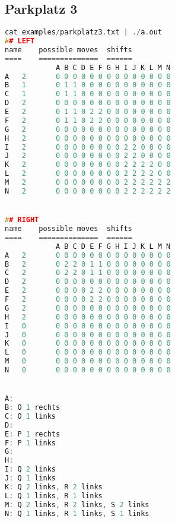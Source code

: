 \documentclass[a4paper,10pt,ngerman]{scrartcl}
\begin{document}
\subsection*{Parkplatz 3}
\begin{lstlisting}[language=C++]
cat examples/parkplatz3.txt | ./a.out
## LEFT
name	possible moves	shifts
====	==============	======
			A B C D E F G H I J K L M N
A	2		0 0 0 0 0 0 0 0 0 0 0 0 0 0
B	1		0 1 1 0 0 0 0 0 0 0 0 0 0 0
C	1		0 1 1 0 0 0 0 0 0 0 0 0 0 0
D	2		0 0 0 0 0 0 0 0 0 0 0 0 0 0
E	2		0 1 1 0 2 2 0 0 0 0 0 0 0 0
F	2		0 1 1 0 2 2 0 0 0 0 0 0 0 0
G	2		0 0 0 0 0 0 0 0 0 0 0 0 0 0
H	2		0 0 0 0 0 0 0 0 0 0 0 0 0 0
I	2		0 0 0 0 0 0 0 0 2 2 0 0 0 0
J	2		0 0 0 0 0 0 0 0 2 2 0 0 0 0
K	2		0 0 0 0 0 0 0 0 2 2 2 2 0 0
L	2		0 0 0 0 0 0 0 0 2 2 2 2 0 0
M	2		0 0 0 0 0 0 0 0 2 2 2 2 2 2
N	2		0 0 0 0 0 0 0 0 2 2 2 2 2 2


## RIGHT
name	possible moves	shifts
====	==============	======
			A B C D E F G H I J K L M N
A	2		0 0 0 0 0 0 0 0 0 0 0 0 0 0
B	2		0 2 2 0 1 1 0 0 0 0 0 0 0 0
C	2		0 2 2 0 1 1 0 0 0 0 0 0 0 0
D	2		0 0 0 0 0 0 0 0 0 0 0 0 0 0
E	2		0 0 0 0 2 2 0 0 0 0 0 0 0 0
F	2		0 0 0 0 2 2 0 0 0 0 0 0 0 0
G	2		0 0 0 0 0 0 0 0 0 0 0 0 0 0
H	2		0 0 0 0 0 0 0 0 0 0 0 0 0 0
I	0		0 0 0 0 0 0 0 0 0 0 0 0 0 0
J	0		0 0 0 0 0 0 0 0 0 0 0 0 0 0
K	0		0 0 0 0 0 0 0 0 0 0 0 0 0 0
L	0		0 0 0 0 0 0 0 0 0 0 0 0 0 0
M	0		0 0 0 0 0 0 0 0 0 0 0 0 0 0
N	0		0 0 0 0 0 0 0 0 0 0 0 0 0 0


A:
B: O 1 rechts
C: O 1 links
D:
E: P 1 rechts
F: P 1 links
G:
H:
I: Q 2 links
J: Q 1 links
K: Q 2 links, R 2 links
L: Q 1 links, R 1 links
M: Q 2 links, R 2 links, S 2 links
N: Q 1 links, R 1 links, S 1 links
\end{lstlisting}
\end{document}
